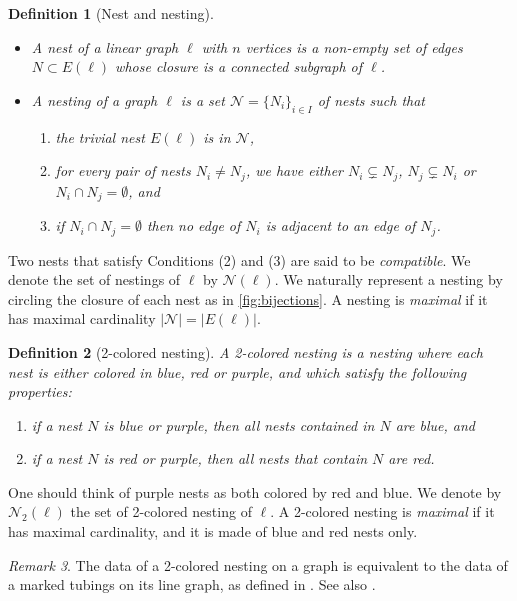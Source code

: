 \documentclass[twoside, 12pt]{amsart}
\newtheorem{definition}{Definition}[section]
\theoremstyle{remark}
\newtheorem{remark}[definition]{\sc Remark}
\newcommand{\gra}{\ell}
\begin{document}
\begin{definition}[Nest and nesting]
\leavevmode
\begin{itemize}[leftmargin=*]
\item A \emph{nest} of a linear graph $\gra$ with $n$ vertices is a non-empty set of edges $N \subset E(\gra)$ whose closure is a connected subgraph of $\gra$.
\item A \emph{nesting} of a graph $\gra$ is a set $\mathcal{N}=\{N_i\}_{i\in I}$ of nests such that 
\begin{enumerate}
    \item the \emph{trivial nest} $E(\gra)$ is in $\mathcal{N}$,
    \item for every pair of nests $N_i\neq N_j$, we have either $N_i \subsetneq N_j$, $N_j \subsetneq N_i$ or $N_i \cap N_j = \emptyset$, and
    \item if $N_i \cap N_j = \emptyset$ then no edge of $N_i$ is adjacent to an edge of $N_j$.
\end{enumerate}
\end{itemize}
\end{definition}

Two nests that satisfy Conditions (2) and (3) are said to be \textit{compatible}. 
We denote the set of nestings of $\gra$ by $\mathcal{N}(\gra)$. 
We naturally represent a nesting by circling the closure of each nest as in \cref{fig:bijections}. 
A nesting is \emph{maximal} if it has maximal cardinality $|\mathcal{N}|=|E(\gra)|$.

\begin{definition}[2-colored nesting] 
A \emph{2-colored nesting} is a nesting where each nest is either colored in blue, red or purple, and which satisfy the following properties: 
\begin{enumerate}
\item if a nest $N$ is blue or purple, then all nests contained in $N$ are blue, and 
\item if a nest $N$ is red or purple, then all nests that contain $N$ are red.
\end{enumerate}
\end{definition}
One should think of purple nests as both colored by red and blue. 
We denote by $\mathcal{N}_2(\gra)$ the set of 2-colored nesting of $\gra$. 
A 2-colored nesting is \emph{maximal} if it has maximal cardinality, and it is made of blue and red nests only. 

\begin{remark} 
The data of a 2-colored nesting on a graph is equivalent to the data of a marked tubings on its line graph, as defined in \cite{DevadossForcey08}. 
See also \cite[Remark 2.4]{LA21}.
\end{remark}
\end{document}
